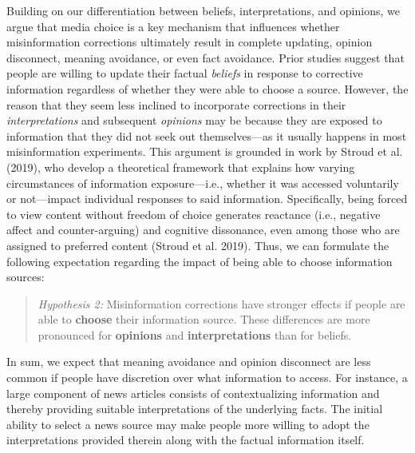 \documentclass[
  12pt,
]{article}
\begin{document}
Building on our differentiation between beliefs, interpretations, and
opinions, we argue that media choice is a key mechanism that influences
whether misinformation corrections ultimately result in complete
updating, opinion disconnect, meaning avoidance, or even fact avoidance.
Prior studies suggest that people are willing to update their factual
\emph{beliefs} in response to corrective information regardless of
whether they were able to choose a source. However, the reason that they
seem less inclined to incorporate corrections in their
\emph{interpretations} and subsequent \emph{opinions} may be because
they are exposed to information that they did not seek out
themselves---as it usually happens in most misinformation experiments.
This argument is grounded in work by Stroud et al. (2019), who develop a
theoretical framework that explains how varying circumstances of
information exposure---i.e., whether it was accessed voluntarily or
not---impact individual responses to said information. Specifically,
being forced to view content without freedom of choice generates
reactance (i.e., negative affect and counter-arguing) and cognitive
dissonance, even among those who are assigned to preferred content
(Stroud et al. 2019). Thus, we can formulate the following expectation
regarding the impact of being able to choose information sources:

\singlespace

\begin{quote}
\emph{Hypothesis 2:} Misinformation corrections have stronger effects if
people are able to \textbf{choose} their information source. These
differences are more pronounced for \textbf{opinions} and
\textbf{interpretations} than for beliefs.
\end{quote}

\vspace{1em}\doublespace

\noindent In sum, we expect that meaning avoidance and opinion
disconnect are less common if people have discretion over what
information to access. For instance, a large component of news articles
consists of contextualizing information and thereby providing suitable
interpretations of the underlying facts. The initial ability to select a
news source may make people more willing to adopt the interpretations
provided therein along with the factual information itself.
\end{document}
